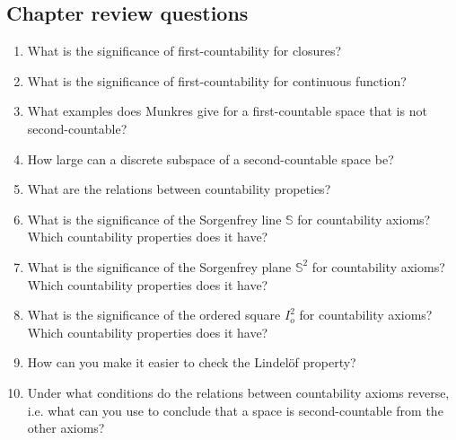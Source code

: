 \subsection{Chapter review questions}

\begin{enumerate}
    \item What is the significance of first-countability for closures?
    \item What is the significance of first-countability for continuous function?
    \item What examples does Munkres give for a first-countable space that is not second-countable?
    \item How large can a discrete subspace of a second-countable space be?
    \item What are the relations between countability propeties?
    \item What is the significance of the Sorgenfrey line \( \mathbb{S} \) for countability axioms? Which countability properties does it have?
    \item What is the significance of the Sorgenfrey plane \( \mathbb{S}^2 \) for countability axioms? Which countability properties does it have?
    \item What is the significance of the ordered square \( I_o^2 \) for countability axioms? Which countability properties does it have?
    \item How can you make it easier to check the Lindel\"of property?
    \item Under what conditions do the relations between countability axioms reverse, i.e. what can you use to conclude that a space is second-countable from the other axioms?
\end{enumerate}


